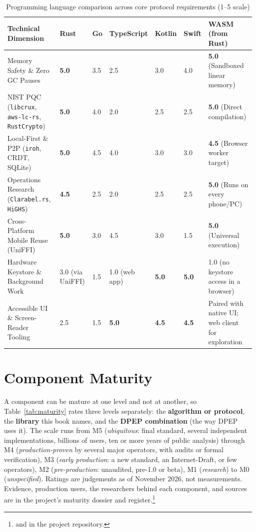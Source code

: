 \documentclass[10pt,twoside,openany]{book}
\theoremstyle{dpepstyle}
\begin{document}
\begin{table}[htbp]
\centering
\caption{Programming language comparison across core protocol requirements (1--5 scale)}
\label{tab:lang-comp}
\scriptsize
\setlength{\tabcolsep}{3.0pt}
\begin{tabularx}{\textwidth}{L{1.25in} C{0.38in} C{0.38in} C{0.52in} C{0.45in} C{0.40in} Y}
\toprule
\textbf{Technical Dimension} & \textbf{Rust} & \textbf{Go} & \textbf{TypeScript} & \textbf{Kotlin} & \textbf{Swift} & \textbf{WASM (from Rust)} \\
\midrule
Memory Safety \& Zero GC Pauses & \textbf{5.0} & 3.5 & 2.5 & 3.0 & 4.0 & \textbf{5.0} (Sandboxed linear memory) \\
NIST PQC (\texttt{libcrux}, \texttt{aws-lc-rs}, \texttt{RustCrypto}) & \textbf{5.0} & 4.0 & 2.0 & 2.5 & 2.5 & \textbf{5.0} (Direct compilation) \\
Local-First \& P2P (\texttt{iroh}, CRDT, SQLite) & \textbf{5.0} & 4.5 & 4.0 & 3.0 & 3.0 & \textbf{4.5} (Browser worker target) \\
Operations Research (\texttt{Clarabel.rs}, \texttt{HiGHS}) & \textbf{4.5} & 2.5 & 2.0 & 2.5 & 2.5 & \textbf{5.0} (Runs on every phone/PC) \\
Cross-Platform Mobile Reuse (UniFFI) & \textbf{5.0} & 3.0 & 4.5 & 3.0 & 1.5 & \textbf{5.0} (Universal execution) \\
Hardware Keystore \& Background Work & 3.0 (via UniFFI) & 1.5 & 1.0 (web app) & \textbf{5.0} & \textbf{5.0} & 1.0 (no keystore access in a browser) \\
Accessible UI \& Screen-Reader Tooling & 2.5 & 1.5 & \textbf{5.0} & \textbf{4.5} & \textbf{4.5} & Paired with native UI; web client for exploration \\
\bottomrule
\end{tabularx}
\end{table}

\section{Component Maturity}
\label{sec:maturity}

A component can be mature at one level and not at another, so Table~\ref{tab:maturity} rates three levels separately: the \textbf{algorithm or protocol}, the \textbf{library} this book names, and the \textbf{DPEP combination} (the way DPEP uses it). The scale runs from M5 (\emph{ubiquitous}: final standard, several independent implementations, billions of users, ten or more years of public analysis) through M4 (\emph{production-proven} by several major operators, with audits or formal verification), M3 (\emph{early production}: a new standard, an Internet-Draft, or few operators), M2 (\emph{pre-production}: unaudited, pre-1.0 or beta), M1 (\emph{research}) to M0 (\emph{unspecified}). Ratings are judgements as of November 2026, not measurements. Evidence, production users, the researchers behind each component, and sources are in the project's maturity dossier and register.\footnote{ and  in the project repository.}
\end{document}
